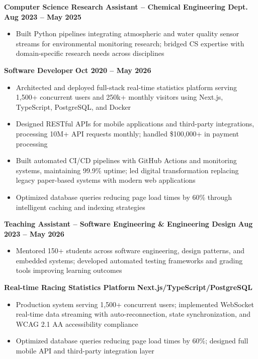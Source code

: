 \documentclass{article}
\begin{document}
\textbf{Computer Science Research Assistant – Chemical Engineering Dept.} \hfill \textbf{Aug 2023 – May 2025}
\begin{itemize}[noitemsep,topsep=2pt]
    \item Built Python pipelines integrating atmospheric and water quality sensor streams for environmental monitoring research; bridged CS expertise with domain-specific research needs across disciplines
\end{itemize}


 \hfill {}

\textbf{Software Developer} \hfill \textbf{Oct 2020 – May 2026}
\begin{itemize}[noitemsep,topsep=2pt]
    \item Architected and deployed full-stack real-time statistics platform serving 1,500+ concurrent users and 250k+ monthly visitors using Next.js, TypeScript, PostgreSQL, and Docker
    \item Designed RESTful APIs for mobile applications and third-party integrations, processing 10M+ API requests monthly; handled \$100,000+ in payment processing
    \item Built automated CI/CD pipelines with GitHub Actions and monitoring systems, maintaining 99.9\% uptime; led digital transformation replacing legacy paper-based systems with modern web applications
    \item Optimized database queries reducing page load times by 60\% through intelligent caching and indexing strategies
\end{itemize}

 \hfill {}

\textbf{Teaching Assistant – Software Engineering \& Engineering Design} \hfill \textbf{Aug 2023 – May 2026}
\begin{itemize}[noitemsep,topsep=2pt]
    \item Mentored 150+ students across software engineering, design patterns, and embedded systems; developed automated testing frameworks and grading tools improving learning outcomes
\end{itemize}


\textbf{Real-time Racing Statistics Platform} \hfill \textbf{Next.js/TypeScript/PostgreSQL}
\begin{itemize}[noitemsep,topsep=2pt]
    \item Production system serving 1,500+ concurrent users; implemented WebSocket real-time data streaming with auto-reconnection, state synchronization, and WCAG 2.1 AA accessibility compliance
    \item Optimized database queries reducing page load times by 60\%; designed full mobile API and third-party integration layer
\end{itemize}
\end{document}
